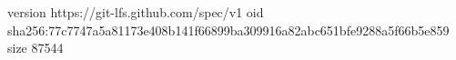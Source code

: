 version https://git-lfs.github.com/spec/v1
oid sha256:77c7747a5a81173e408b141f66899ba309916a82abc651bfe9288a5f66b5e859
size 87544
